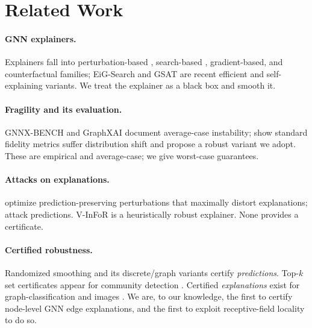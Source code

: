 \documentclass[11pt]{article}
\begin{document}
\section{Related Work}
\paragraph{GNN explainers.} Explainers fall into perturbation-based
\citep{ying2019gnnexplainer,luo2020pgexplainer}, search-based
\citep{yuan2021subgraphx}, gradient-based, and counterfactual
\citep{lucic2022cfgnnexplainer} families; EiG-Search \citep{lu2024eigsearch} and
GSAT \citep{miao2022gsat} are recent efficient and self-explaining variants. We
treat the explainer as a black box and smooth it.

\paragraph{Fragility and its evaluation.} GNNX-BENCH \citep{agarwal2023gnnxbench}
and GraphXAI \citep{agarwal2022graphxai} document average-case instability;
\citet{zheng2024robustfidelity} show standard fidelity metrics suffer
distribution shift and propose a robust variant we adopt. These are empirical and
average-case; we give worst-case guarantees.

\paragraph{Attacks on explanations.} \citet{li2024gxattack} optimize
prediction-preserving perturbations that maximally distort explanations;
\citet{zugner2018nettack} attack predictions. V-InFoR \citep{wang2023vinfor} is a
heuristically robust explainer. None provides a certificate.

\paragraph{Certified robustness.} Randomized smoothing \citep{cohen2019smoothing}
and its discrete/graph variants
\citep{lee2019discrete,bojchevski2020sparse,scholten2022interception,schuchardt2023localized}
certify \emph{predictions}. Top-$k$ set certificates appear for community
detection \citep{jia2020topk}. Certified \emph{explanations} exist for
graph-classification \citep{li2025xgnncert} and images
\citep{anani2025pixelcert}. We are, to our knowledge, the first to certify
node-level GNN edge explanations, and the first to exploit receptive-field
locality to do so.
\end{document}
